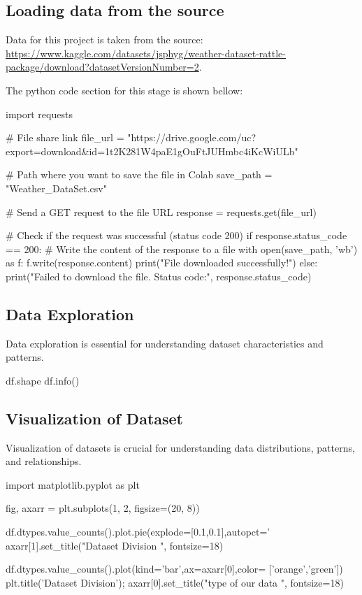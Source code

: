 \documentclass{josis}
\begin{document}
\subsection{Loading data from the source}
Data for this project is taken from the source: \url{https://www.kaggle.com/datasets/jsphyg/weather-dataset-rattle-package/download?datasetVersionNumber=2}.

The python code section for this stage is shown bellow:
\begin{python}
import requests

# File share link
file_url = "https://drive.google.com/uc?export=download&id=1t2K281W4paE1gOuFtJUHmbc4iKcWiULb"

# Path where you want to save the file in Colab
save_path = "Weather_DataSet.csv"

# Send a GET request to the file URL
response = requests.get(file_url)

# Check if the request was successful (status code 200)
if response.status_code == 200:
    # Write the content of the response to a file
    with open(save_path, 'wb') as f:
        f.write(response.content)
    print("File downloaded successfully!")
else:
    print("Failed to download the file. Status code:", response.status_code)
\end{python}

\subsection{Data Exploration}
Data exploration is essential for understanding dataset characteristics and patterns.
\begin{python}
df.shape
df.info()
\end{python}

\subsection{Visualization of Dataset}
Visualization of datasets is crucial for understanding data distributions, patterns, and relationships. 
\begin{python}
import matplotlib.pyplot as plt

fig, axarr = plt.subplots(1, 2, figsize=(20, 8))

df.dtypes.value_counts().plot.pie(explode=[0.1,0.1],autopct='%
axarr[1].set_title("Dataset Division ", fontsize=18)

df.dtypes.value_counts().plot(kind='bar',ax=axarr[0],color= ['orange','green'])
plt.title('Dataset Division');
axarr[0].set_title("type of our data ", fontsize=18)
\end{python}   
\end{document}
